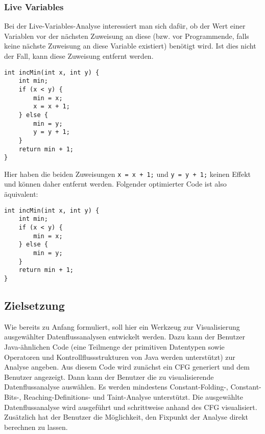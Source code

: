 \subsubsection{Live Variables}
Bei der Live-Variables-Analyse interessiert man sich dafür, ob der Wert einer Variablen vor der nächsten Zuweisung an diese (bzw. vor Programmende, falls keine nächste Zuweisung an diese Variable existiert) benötigt wird. 
Ist dies nicht der Fall, kann diese Zuweisung entfernt werden.

\par

\begin{lstlisting}[frame=single, captionpos=b, caption=Beispielcode für Live-Variables-Analyse]
int incMin(int x, int y) {
	int min;
	if (x < y) {
		min = x;
		x = x + 1;
	} else {
		min = y;
		y = y + 1;
	}
	return min + 1;
}
\end{lstlisting}

\par

Hier haben die beiden Zuweisungen \lstinline{x = x + 1;} und \lstinline{y = y + 1;} keinen Effekt und können daher entfernt werden.
Folgender optimierter Code ist also äquivalent:

\par

\begin{lstlisting}[frame=single, captionpos=b, caption=Mittels Live-Variables-Analyse optimierte Version von Listing 7]
int incMin(int x, int y) {
	int min;
	if (x < y) {
		min = x;
	} else {
		min = y;
	}
	return min + 1;
}
\end{lstlisting}

\subsection{Zielsetzung}
Wie bereits zu Anfang formuliert, soll hier ein Werkzeug zur Visualisierung ausgewählter Datenflussanalysen entwickelt werden.
Dazu kann der Benutzer Java-ähnlichen Code (eine Teilmenge der primitiven Datentypen sowie Operatoren und Kontrollflussstrukturen von Java werden unterstützt) zur Analyse angeben.
Aus diesem Code wird zunächst ein CFG generiert und dem Benutzer angezeigt.
Dann kann der Benutzer die zu visualisierende Datenflussanalyse auswählen.
Es werden mindestens Constant-Folding-, Constant-Bits-, Reaching-Definitions- und Taint-Analyse unterstützt.
Die ausgewählte Datenflussanalyse wird ausgeführt und schrittweise anhand des CFG visualisiert.
Zusätzlich hat der Benutzer die Möglichkeit, den Fixpunkt der Analyse direkt berechnen zu lassen.
